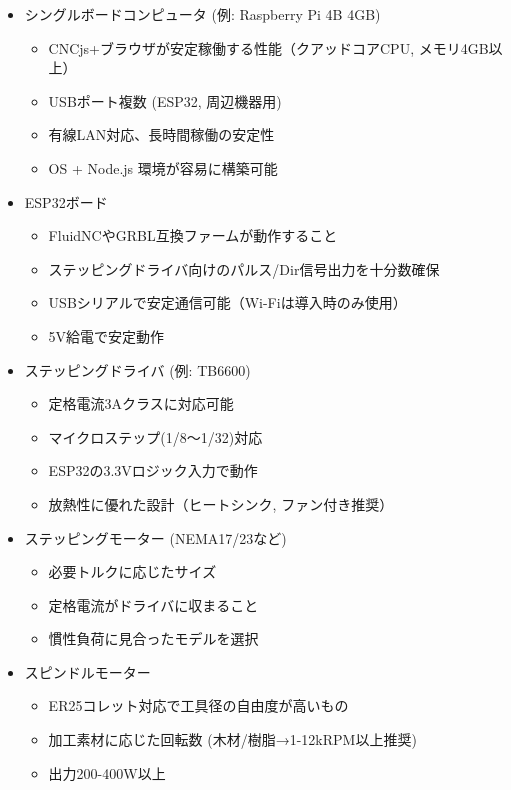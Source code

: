 \documentclass[uplatex,dvipdfmx]{ujarticle}
\begin{document}
\begin{itemize}
  \item シングルボードコンピュータ (例: Raspberry Pi 4B 4GB)
    \begin{itemize}
      \item CNCjs+ブラウザが安定稼働する性能（クアッドコアCPU, メモリ4GB以上）
      \item USBポート複数 (ESP32, 周辺機器用)
      \item 有線LAN対応、長時間稼働の安定性
      \item OS + Node.js 環境が容易に構築可能
    \end{itemize}

  \item ESP32ボード
    \begin{itemize}
      \item FluidNCやGRBL互換ファームが動作すること
      \item ステッピングドライバ向けのパルス/Dir信号出力を十分数確保
      \item USBシリアルで安定通信可能（Wi-Fiは導入時のみ使用）
      \item 5V給電で安定動作
    \end{itemize}

  \item ステッピングドライバ (例: TB6600)
    \begin{itemize}
      \item 定格電流3Aクラスに対応可能
      \item マイクロステップ(1/8～1/32)対応
      \item ESP32の3.3Vロジック入力で動作
      \item 放熱性に優れた設計（ヒートシンク, ファン付き推奨）
    \end{itemize}

  \item ステッピングモーター (NEMA17/23など)
    \begin{itemize}
      \item 必要トルクに応じたサイズ
      \item 定格電流がドライバに収まること
      \item 慣性負荷に見合ったモデルを選択
    \end{itemize}

  \item スピンドルモーター
    \begin{itemize}
      \item ER25コレット対応で工具径の自由度が高いもの
      \item 加工素材に応じた回転数 (木材/樹脂→1-12kRPM以上推奨)
      \item 出力200-400W以上
    \end{itemize}


\end{itemize}
\end{document}
